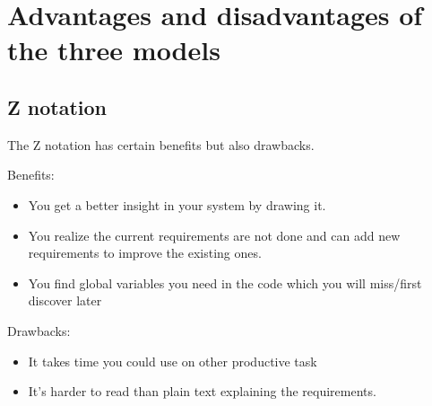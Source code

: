 \documentclass[Main_Assignment2]{subfiles}
\begin{document}
\section{Advantages and disadvantages of the three models}

\subsection{Z notation}
The Z notation has certain benefits but also drawbacks.



Benefits:
\vspace{-10pt}
\begin{itemize}
	\item You get a better insight in your system by drawing it.
	\item You realize the current requirements are not done and can add new requirements to improve the existing ones.
	\item You find global variables you need in the code which you will miss/first discover later
\end{itemize}

Drawbacks:
\vspace{-10pt}
\begin{itemize}
	\item It takes time you could use on other productive task
	\item It's harder to read than plain text explaining the requirements.
\end{itemize}
\end{document}
